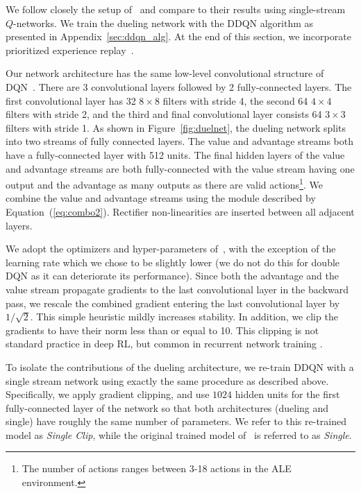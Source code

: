 We follow closely the setup of~\citet{vanHasselt:2015} and compare
to their results using single-stream $Q$-networks. We train the dueling network with the DDQN algorithm as presented in Appendix~\ref{sec:ddqn_alg}. At the end of this section, we incorporate
prioritized experience replay~\cite{Schaul:2015}.


Our network architecture has the same low-level convolutional structure of DQN~\cite{Mnih:2015,vanHasselt:2015}.
There are 3 convolutional layers followed by 2 fully-connected layers. The first convolutional layer has 32 $8 \times 8$ filters with stride 4, the second 64 $4 \times 4$ filters with stride 2, and the third and final convolutional layer consists 64 $3 \times 3$ filters with stride 1. 
As shown in Figure~\ref{fig:duelnet},
the dueling network splits into two streams of fully connected layers. 
The value and advantage streams both have a fully-connected layer with 512 units. 
The final hidden layers of the value and advantage streams are both fully-connected
with the value stream having one output and the advantage as many outputs
as there are valid actions\footnote{The number of actions ranges between 3-18 actions in the ALE environment.}.
We combine the value and advantage streams using the module described by Equation~(\ref{eq:combo2}).
Rectifier non-linearities \cite{Fukushima:1980} are inserted between all adjacent layers.


We adopt the optimizers and hyper-parameters of~\citet{vanHasselt:2015},
with the exception of the learning rate which we chose to be slightly lower (we do not do this for double DQN as it can deteriorate its performance).
Since both the advantage and the value stream propagate gradients to the 
last convolutional layer in the backward pass, we rescale the combined gradient
entering the last convolutional layer by $1/\sqrt{2}$. This simple heuristic mildly increases stability.
In addition, we clip the gradients to have their norm less than or equal to 10. This clipping is not standard practice in deep RL, but common in recurrent network training \cite{Bengio:2013}. 

To isolate the contributions of the dueling architecture, we re-train DDQN
with a single stream network using exactly the same procedure 
as described above. Specifically, we apply gradient clipping, and
use $1024$ hidden units for the first fully-connected layer of the
network so that both architectures (dueling and single) have roughly the same
number of parameters. We refer to this re-trained model as \emph{Single Clip}, while the original trained model of~\citet{vanHasselt:2015} is referred to as \emph{Single}.

